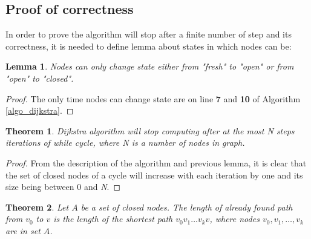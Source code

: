 \documentclass[thesis=M,english]{FITthesis}[2012/10/20]
\newtheorem{theorem}{Theorem}
\newtheorem{lemma}{Lemma}
\begin{document}
\subsection{Proof of correctness}

In order to prove the algorithm will stop after a finite number of step and its correctness, it is needed to define lemma about states in which nodes can be:

\begin{lemma}
Nodes can only change state either from "\textit{fresh}" to "\textit{open}" or from "\textit{open}" to "\textit{closed}".
\end{lemma}

\begin{proof}
The only time nodes can change state are on line \textbf{7} and \textbf{10} of Algorithm \ref{algo_dijkstra}.
\end{proof}

\begin{theorem}
\label{theorem2}
Dijkstra algorithm will stop computing after at the most \textit{N} steps iterations of while cycle, where N is a number of nodes in graph. 
\end{theorem}

\begin{proof}
From the description of the algorithm and previous lemma, it is clear that the set of closed nodes of a cycle will increase with each iteration by one and its size being between 0 and \textit{N}.
\end{proof}

\begin{theorem}
Let $A$ be a set of closed nodes. The length of already found path from $v_0$ to $v$ is the length of the shortest path $v_0 v_1 \dots v_k v$, where nodes $v_0, v_1, \dots , v_k$ are in set $A$.
\end{theorem}
\end{document}
